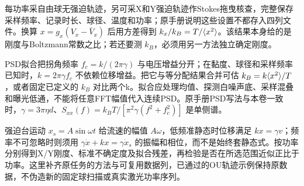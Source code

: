 每功率采自由球无强迫轨迹，另可采X和Y强迫轨迹作Stokes拖曳核查，完整保存采样频率、记录时长、球径、温度和功率；原手册说明这些设置不都存入四列文件。换算 $x=g_x(V_x-\bar V_x)$ 后用方差得到 $k_x/k_B=T/\langle x^2\rangle$。该结果本身给的是刚度与Boltzmann常数之比；若还要测 $k_B$，必须用另一方法独立确定刚度。

PSD拟合把拐角频率 $f_c=k/(2\pi\gamma)$ 与电压增益分开；在黏度、球径和采样频率已知时，$k=2\pi\gamma f_c$ 不依赖位移增益。把它与等分配结果合并可估 $k_B=k\langle x^2\rangle/T$，或者固定已定义的 $k_B$ 对比两个k。拟合应处理均值、探测白噪声底、采样混叠和曝光低通，不能将任意FFT幅值代入连续PSD。原手册PSD写法与本卷一致时，$\gamma=3\pi\eta d$、$S_{xx}(f)=k_BT/[\pi^2\gamma(f^2+f_c^2)]$ 是单侧谱。

强迫台运动 $x_s=A\sin\omega t$ 给流速的幅值 $A\omega$，低频准静态时位移满足 $kx=\gamma v$；频率不可忽略时则须用 $\gamma\dot x+kx=\gamma\dot x_s$ 的振幅和相位，而不是始终套静态式。按功率分别得到X/Y刚度、标准不确定度及拟合残差，再检验是否在所选范围近似正比于功率。这里补齐原任务的方法与可复用数据列，已通过的OU轨迹示例保持原数据，不伪造新的固定球扫描或真实激光功率序列。
